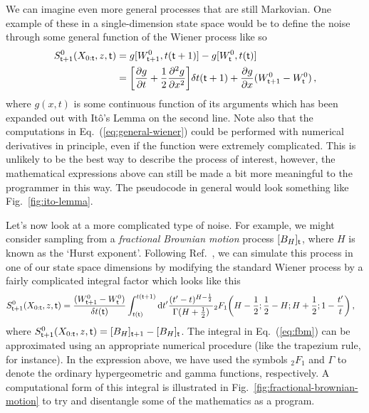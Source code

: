 We can imagine even more general processes that are still Markovian. One example of these in a single-dimension state space would be to define the noise through some general function of the Wiener process like so
\begin{align}
S^0_{{\sf t}+1}(X_{0:{\sf t}},z,{\sf t}) &= g[W^0_{{\sf t}+1},t({\sf t}+1)]-g[W^0_{\sf t}, t({\sf t})] \\
&= \bigg[ \frac{\partial g}{\partial t} + \frac{1}{2}\frac{\partial^2 g}{\partial x^2} \bigg] \delta t ({\sf t}+1) + \frac{\partial g}{\partial x} (W^0_{{\sf t}+1}-W^0_{\sf t}) \label{eq:general-wiener}\,,
\end{align}
where $g(x,t)$ is some continuous function of its arguments which has been expanded out with Itô's Lemma on the second line. Note also that the computations in Eq.~(\ref{eq:general-wiener}) could be performed with numerical derivatives in principle, even if the function were extremely complicated. This is unlikely to be the best way to describe the process of interest, however, the mathematical expressions above can still be made a bit more meaningful to the programmer in this way. The pseudocode in general would look something like Fig.~\ref{fig:ito-lemma}.

Let's now look at a more complicated type of noise. For example, we might consider sampling from a \emph{fractional Brownian motion} process $[B_{H}]_{\sf t}$, where $H$ is known as the `Hurst exponent'. Following Ref.~\cite{decreusefond1999stochastic}, we can simulate this process in one of our state space dimensions by modifying the standard Wiener process by a fairly complicated integral factor which looks like this
\begin{align}
S^{0}_{{\sf t}+1}(X_{0:{\sf t}},z,{\sf t}) &= \frac{(W^0_{{\sf t}+1} - W^0_{\sf t})}{\delta t({\sf t})}\int^{t({\sf t}+1)}_{t({\sf t})}{\rm d}t' \frac{(t'-t)^{H-\frac{1}{2}}}{\Gamma (H+\frac{1}{2})} {}_2F_1 \bigg( H-\frac{1}{2};\frac{1}{2}-H;H+\frac{1}{2};1-\frac{t'}{t}\bigg) \label{eq:fbm} \,,
\end{align}
where $S^{0}_{{\sf t}+1}(X_{0:{\sf t}},z,{\sf t})=[B_{H}]_{{\sf t}+1}-[B_{H}]_{{\sf t}}$. The integral in Eq.~(\ref{eq:fbm}) can be approximated using an appropriate numerical procedure (like the trapezium rule, for instance). In the expression above, we have used the symbols ${}_2F_1$ and $\Gamma$ to denote the ordinary hypergeometric and gamma functions, respectively. A computational form of this integral is illustrated in Fig.~\ref{fig:fractional-brownian-motion} to try and disentangle some of the mathematics as a program.

